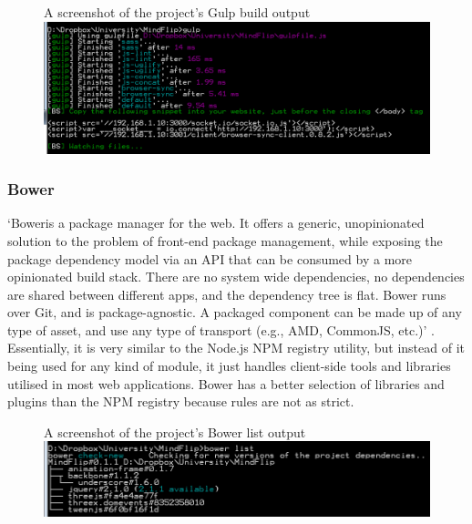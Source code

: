 \documentclass[final]{cmpreport}
\begin{document}

\begin{figure}[h!]{A screenshot of the project's Gulp build output}
  \includegraphics[width=1.0\textwidth]{gulp.png}
\end{figure}

\subsubsection{Bower}
`Bower\footnotemark[23] is a package manager for the web. It offers a generic, unopinionated solution to the problem of front-end package management, while exposing the package dependency model via an API that can be consumed by a more opinionated build stack. There are no system wide dependencies, no dependencies are shared between different apps, and the dependency tree is flat. Bower runs over Git, and is package-agnostic. A packaged component can be made up of any type of asset, and use any type of transport (e.g., AMD, CommonJS, etc.)' \citep{Twitter}. Essentially, it is very similar to the Node.js NPM registry utility, but instead of it being used for any kind of module, it just handles client-side tools and libraries utilised in most web applications. Bower has a better selection of libraries and plugins than the NPM registry because rules are not as strict.


\begin{figure}[h!]{A screenshot of the project's Bower list output}
  \includegraphics[width=1.0\textwidth]{bower.png}
\end{figure}
\end{document}
